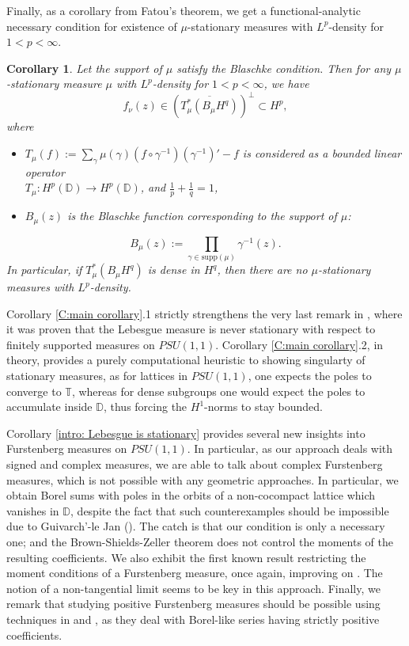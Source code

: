 \documentclass[11pt]{article}
\newtheorem{corollary}{Corollary}[section]
\begin{document}
Finally, as a corollary from Fatou's theorem, we get a functional-analytic necessary condition for existence of $\mu$-stationary measures with $L^p$-density for $1 < p < \infty$.

\begin{corollary}
	\label{functional-analytic necessary condition}
	Let the support of $\mu$ satisfy the Blaschke condition. Then for any $\mu$-stationary measure $\mu$ with $L^p$-density for $1 < p < \infty$, we have
	\[
	f_\nu(z) \in (\overline{T_\mu^*(B_\mu H^q)})^{\perp} \subset H^p,
	\]
	where
	\begin{itemize}
		\item $T_\mu(f) := \sum_{\gamma} \mu(\gamma) (f \circ \gamma^{-1}) (\gamma^{-1})' - f$ is considered as a bounded linear operator \\ $T_\mu : H^p(\mathbb{D}) \rightarrow H^p(\mathbb{D})$, and $\frac{1}{p} + \frac{1}{q} = 1$,
		\item $B_\mu(z)$ is the Blaschke function corresponding to the support of $\mu$:
	\end{itemize}
	\[
	B_\mu(z) := \prod_{\gamma \in \text{supp}(\mu)} \gamma^{-1}(z).
	\]
	In particular, if $T_\mu^*(B_\mu H^q)$ is dense in $H^q$, then there are no $\mu$-stationary measures with $L^p$-density.
\end{corollary}




Corollary \ref{C:main corollary}.1 strictly strengthens the very last remark in \cite{Bourgain2012}, where it was proven that the Lebesgue measure is never stationary with respect to finitely supported measures on $PSU(1,1)$. Corollary \ref{C:main corollary}.2, in theory, provides a purely computational heuristic to showing singularty of stationary measures, as for lattices in $PSU(1,1)$, one expects the poles to converge to $\mathbb{T}$, whereas for dense subgroups one would expect the poles to accumulate inside $\mathbb{D}$, thus forcing the $H^1$-norms to stay bounded. 


Corollary \ref{intro: Lebesgue is stationary} provides several new insights into Furstenberg measures on $PSU(1,1)$. In particular, as our approach deals with signed and complex measures, we are able to talk about complex Furstenberg measures, which is not possible with any geometric approaches. In particular, we obtain Borel sums with poles in the orbits of a non-cocompact lattice which vanishes in $\mathbb{D}$, despite the fact that such counterexamples should be impossible due to Guivarch'-le Jan (\cite{guivarch1990}). The catch is that our condition is only a necessary one; and the Brown-Shields-Zeller theorem does not control the moments of the resulting coefficients. We also exhibit the first known result restricting the moment conditions of a Furstenberg measure, once again, improving on \cite{Bourgain2012}. The notion of a non-tangential limit seems to be key in this approach. Finally, we remark that studying positive Furstenberg measures should be possible using techniques in \cite{bonsall1989vanishing} and \cite{hayman1990bases}, as they deal with Borel-like series having strictly positive coefficients.
\end{document}
